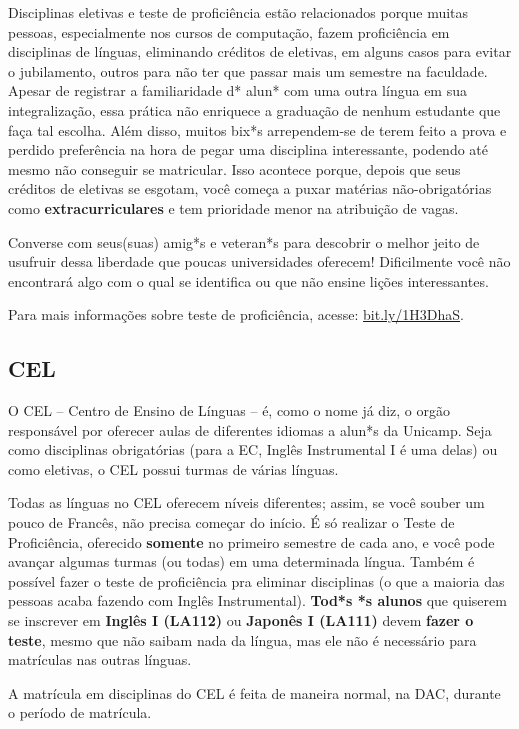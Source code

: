 Disciplinas eletivas e teste de proficiência estão relacionados porque muitas
pessoas, especialmente nos cursos de computação, fazem proficiência em
disciplinas de línguas, eliminando créditos de eletivas, em alguns casos para
evitar o jubilamento, outros para não ter que passar mais um semestre na
faculdade. Apesar de registrar a familiaridade d* alun* com uma outra língua em
sua integralização, essa prática não enriquece a graduação de nenhum estudante
que faça tal escolha. Além disso, muitos bix*s arrependem-se de terem feito a
prova e perdido preferência na hora de pegar uma disciplina interessante,
podendo até mesmo não conseguir se matricular. Isso acontece porque, depois que
seus créditos de eletivas se esgotam, você começa a puxar matérias
não-obrigatórias como \textbf{extracurriculares} e tem prioridade menor na
atribuição de vagas.

Converse com seus(suas) amig*s e veteran*s para descobrir o melhor jeito de
usufruir dessa liberdade que poucas universidades oferecem! Dificilmente você
não encontrará algo com o qual se identifica ou que não ensine lições
interessantes.

Para mais informações sobre teste de proficiência, acesse: \url{bit.ly/1H3DhaS}.

\subsection{CEL}

O CEL – Centro de Ensino de Línguas – é, como o nome já diz, o orgão responsável
por oferecer aulas de diferentes idiomas a alun*s da Unicamp. Seja como
disciplinas obrigatórias (para a EC, Inglês Instrumental I é uma delas) ou como
eletivas, o CEL possui turmas de várias línguas.

Todas as línguas no CEL oferecem níveis diferentes; assim, se você souber um pouco
de Francês, não precisa começar do início. É só realizar o Teste de Proficiência,
oferecido \textbf{somente} no primeiro semestre de cada ano, e você pode avançar
algumas turmas (ou todas) em uma determinada língua. Também é possível fazer o
teste de proficiência pra eliminar disciplinas (o que a maioria das pessoas acaba
fazendo com Inglês Instrumental). \textbf{Tod*s *s alunos} que quiserem se
inscrever em \textbf{Inglês I (LA112)} ou \textbf{Japonês I (LA111)} devem
\textbf{fazer o teste}, mesmo que não saibam nada da língua, mas ele não é
necessário para matrículas nas outras línguas.

A matrícula em disciplinas do CEL é feita de maneira normal, na DAC, durante o
período de matrícula.

